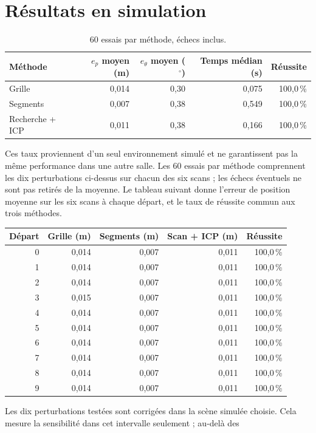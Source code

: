 \documentclass[11pt,a4paper]{article}
\begin{document}
\section{Résultats en simulation}
\begin{table}[H]\centering\small
\begin{tabular}{lrrrr}\toprule Méthode & $e_p$ moyen (m) & $e_\theta$ moyen ($^\circ$) &
Temps médian (s) & Réussite\\\midrule
Grille & 0,014 & 0,30 & 0,075 & 100,0\,\% \\
Segments & 0,007 & 0,38 & 0,549 & 100,0\,\% \\
Recherche + ICP & 0,011 & 0,38 & 0,166 & 100,0\,\% \\
\bottomrule\end{tabular}
\caption{60 essais par méthode, échecs inclus.}
\end{table}
Ces taux proviennent d'un seul environnement simulé et ne garantissent pas
la même performance dans une autre salle.
Les 60 essais par méthode comprennent les dix perturbations ci-dessus
sur chacun des six scans ; les échecs éventuels ne sont pas retirés de la
moyenne. Le tableau suivant donne l'erreur de position moyenne sur les
six scans à chaque départ, et le taux de réussite commun aux trois méthodes.
\begin{center}\small
\begin{tabular}{rrrrr}\toprule
Départ & Grille (m) & Segments (m) & Scan + ICP (m) & Réussite\\\midrule
0 & 0,014 & 0,007 & 0,011 & 100,0\,\% \\
1 & 0,014 & 0,007 & 0,011 & 100,0\,\% \\
2 & 0,014 & 0,007 & 0,011 & 100,0\,\% \\
3 & 0,015 & 0,007 & 0,011 & 100,0\,\% \\
4 & 0,014 & 0,007 & 0,011 & 100,0\,\% \\
5 & 0,014 & 0,007 & 0,011 & 100,0\,\% \\
6 & 0,014 & 0,007 & 0,011 & 100,0\,\% \\
7 & 0,014 & 0,007 & 0,011 & 100,0\,\% \\
8 & 0,014 & 0,007 & 0,011 & 100,0\,\% \\
9 & 0,014 & 0,007 & 0,011 & 100,0\,\% \\
\bottomrule\end{tabular}
\end{center}
Les dix perturbations testées sont corrigées dans la scène simulée choisie.
Cela mesure la sensibilité dans cet intervalle seulement ; au-delà des
\end{document}

